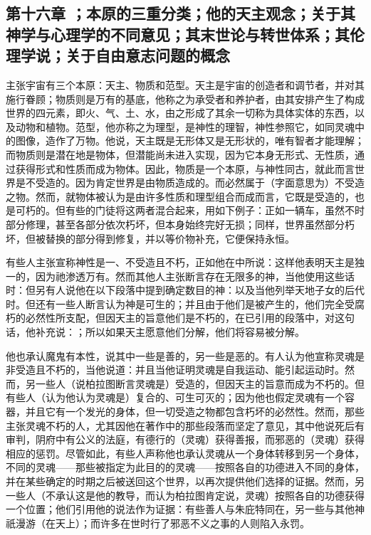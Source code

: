 
\subsection{第十六章 ；本原的三重分类；他的天主观念；关于其神学与心理学的不同意见；其末世论与转世体系；其伦理学说；关于自由意志问题的概念}

主张宇宙有三个本原：天主、物质和范型。天主是宇宙的创造者和调节者，并对其施行眷顾；物质则是万有的基底，他称之为承受者和养护者，由其安排产生了构成世界的四元素，即火、气、土、水，由之形成了其余一切称为具体实体的东西，以及动物和植物。范型，他亦称之为理型，是神性的理智，神性参照它，如同灵魂中的图像，造作了万物。他说，天主既是无形体又是无形状的，唯有智者才能理解；而物质则是潜在地是物体，但潜能尚未进入实现，因为它本身无形式、无性质，通过获得形式和性质而成为物体。因此，物质是一个本原，与神性同古，就此而言世界是不受造的。因为肯定世界是由物质造成的。而必然属于（字面意思为）不受造之物。然而，就物体被认为是由许多性质和理型组合而成而言，它既是受造的，也是可朽的。但有些的门徒将这两者混合起来，用如下例子：正如一辆车，虽然不时部分修理，甚至各部分依次朽坏，但本身始终完好无损；同样，世界虽然部分朽坏，但被替换的部分得到修复，并以等价物补充，它便保持永恒。\par

有些人主张宣称神性是一、不受造且不朽，正如他在中所说：这样他表明天主是独一的，因为祂渗透万有。然而其他人主张断言存在无限多的神，当他使用这些话时：但另有人说他在以下段落中提到确定数目的神：以及当他列举天地子女的后代时。但还有一些人断言认为神是可生的；并且由于他们是被产生的，他们完全受腐朽的必然性所支配，但因天主的旨意他们是不朽的，在已引用的段落中，对这句话，他补充说：；所以如果天主愿意他们分解，他们将容易被分解。\par

他也承认魔鬼有本性，说其中一些是善的，另一些是恶的。有人认为他宣称灵魂是非受造且不朽的，当他说道：并且当他证明灵魂是自我运动、能引起运动时。然而，另一些人（说柏拉图断言灵魂是）受造的，但因天主的旨意而成为不朽的。但有些人（认为他认为灵魂是）复合的、可生可灭的；因为他也假定灵魂有一个容器，并且它有一个发光的身体，但一切受造之物都包含朽坏的必然性。然而，那些主张灵魂不朽的人，尤其因他在著作中的那些段落而坚定了意见，其中他说死后有审判，阴府中有公义的法庭，有德行的（灵魂）获得善报，而邪恶的（灵魂）获得相应的惩罚。尽管如此，有些人声称他也承认灵魂从一个身体转移到另一个身体，不同的灵魂——那些被指定为此目的的灵魂——按照各自的功德进入不同的身体，并在某些确定的时期之后被送回这个世界，以再次提供他们选择的证据。然而，另一些人（不承认这是他的教导，而认为柏拉图肯定说，灵魂）按照各自的功德获得一个位置；他们引用他的说法作为证据：有些善人与朱庇特同在，另一些与其他神祇漫游（在天上）；而许多在世时行了邪恶不义之事的人则陷入永罚。\par

